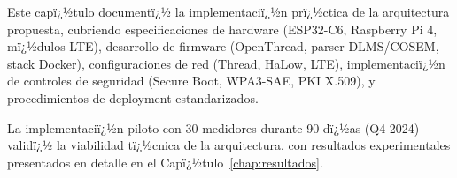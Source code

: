 Este capï¿½tulo documentï¿½ la implementaciï¿½n prï¿½ctica de la arquitectura propuesta, cubriendo especificaciones de hardware (ESP32-C6, Raspberry Pi 4, mï¿½dulos LTE), desarrollo de firmware (OpenThread, parser DLMS/COSEM, stack Docker), configuraciones de red (Thread, HaLow, LTE), implementaciï¿½n de controles de seguridad (Secure Boot, WPA3-SAE, PKI X.509), y procedimientos de deployment estandarizados.

La implementaciï¿½n piloto con 30 medidores durante 90 dï¿½as (Q4 2024) validï¿½ la viabilidad tï¿½cnica de la arquitectura, con resultados experimentales presentados en detalle en el Capï¿½tulo~\ref{chap:resultados}.


